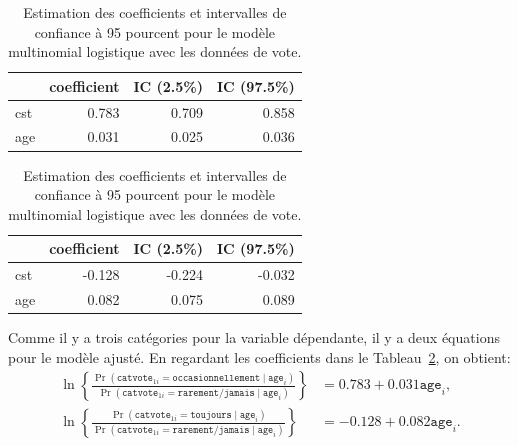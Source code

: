 \documentclass[
  11pt,
  letterpaper,
]{scrbook}
\theoremstyle{definition}
\theoremstyle{remark}
\begin{document}
\begin{table}

\caption{\label{tbl-multinom-coefs}Estimation des coefficients et
intervalles de confiance à 95 pourcent pour le modèle multinomial
logistique avec les données de vote.}\begin{minipage}[t]{\linewidth}

{\centering 

\centering
\begin{tabular}[t]{lrrr}
\toprule
  & coefficient & IC (2.5\%) & IC (97.5\%)\\
\midrule
cst & 0.783 & 0.709 & 0.858\\
age & 0.031 & 0.025 & 0.036\\
\bottomrule
\end{tabular}

}

\end{minipage}%
\newline
\begin{minipage}[t]{\linewidth}

{\centering 

\centering
\begin{tabular}[t]{lrrr}
\toprule
  & coefficient & IC (2.5\%) & IC (97.5\%)\\
\midrule
cst & -0.128 & -0.224 & -0.032\\
age & 0.082 & 0.075 & 0.089\\
\bottomrule
\end{tabular}

}

\end{minipage}%

\end{table}

Comme il y a trois catégories pour la variable dépendante, il y a deux
équations pour le modèle ajusté. En regardant les coefficients dans le
Tableau~\ref{tbl-multinom-coefs}, on obtient: \begin{align*}
\ln \left\{\frac{\Pr(\texttt{catvote}_{1i}= \texttt{occasionnellement}\mid \texttt{age}_i)}{\Pr(\texttt{catvote}_{1i} = \texttt{rarement/jamais} \mid \texttt{age}_i)} \right\} &=
0.783 + 
0.031 \texttt{age}_i, \\ 
\ln \left\{\frac{\Pr(\texttt{catvote}_{1i}= \texttt{toujours}\mid \texttt{age}_i)}{\Pr(\texttt{catvote}_{1i}= \texttt{rarement/jamais}  \mid \texttt{age}_i)} \right\} &= 
-0.128 + 0.082\texttt{age}_i. 
\end{align*}
\end{document}
